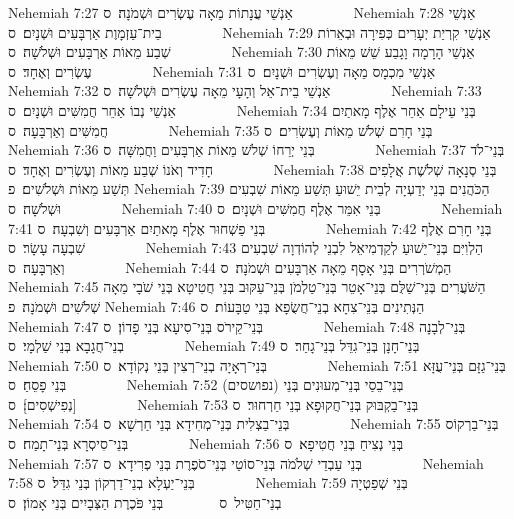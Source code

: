 Nehemiah 7:27	אַנְשֵׁי עֲנָתוֹת מֵאָה עֶשְׂרִים וּשְׁמֹנָה׃ {ס}        
Nehemiah 7:28	אַנְשֵׁי בֵית־עַזְמָוֶת אַרְבָּעִים וּשְׁנָיִם׃ {ס}        
Nehemiah 7:29	אַנְשֵׁי קִרְיַת יְעָרִים כְּפִירָה וּבְאֵרוֹת שְׁבַע מֵאוֹת אַרְבָּעִים וּשְׁלֹשָׁה׃ {ס}        
Nehemiah 7:30	אַנְשֵׁי הָרָמָה וָגָבַע שֵׁשׁ מֵאוֹת עֶשְׂרִים וְאֶחָד׃ {ס}        
Nehemiah 7:31	אַנְשֵׁי מִכְמָס מֵאָה וְעֶשְׂרִים וּשְׁנָיִם׃ {ס}        
Nehemiah 7:32	אַנְשֵׁי בֵית־אֵל וְהָעָי מֵאָה עֶשְׂרִים וּשְׁלֹשָׁה׃ {ס}        
Nehemiah 7:33	אַנְשֵׁי נְבוֹ אַחֵר חֲמִשִּׁים וּשְׁנָיִם׃ {ס}        
Nehemiah 7:34	בְּנֵי עֵילָם אַחֵר אֶלֶף מָאתַיִם חֲמִשִּׁים וְאַרְבָּעָה׃ {ס}        
Nehemiah 7:35	בְּנֵי חָרִם שְׁלֹשׁ מֵאוֹת וְעֶשְׂרִים׃ {ס}        
Nehemiah 7:36	בְּנֵי יְרֵחוֹ שְׁלֹשׁ מֵאוֹת אַרְבָּעִים וַחֲמִשָּׁה׃ {ס}        
Nehemiah 7:37	בְּנֵי־לֹד חָדִיד וְאֹנוֹ שְׁבַע מֵאוֹת וְעֶשְׂרִים וְאֶחָד׃ {ס}        
Nehemiah 7:38	בְּנֵי סְנָאָה שְׁלֹשֶׁת אֲלָפִים תְּשַׁע מֵאוֹת וּשְׁלֹשִׁים׃ {פ}
Nehemiah 7:39	הַכֹּהֲנִים בְּנֵי יְדַעְיָה לְבֵית יֵשׁוּעַ תְּשַׁע מֵאוֹת שִׁבְעִים וּשְׁלֹשָׁה׃ {ס}        
Nehemiah 7:40	בְּנֵי אִמֵּר אֶלֶף חֲמִשִּׁים וּשְׁנָיִם׃ {ס}        
Nehemiah 7:41	בְּנֵי פַשְׁחוּר אֶלֶף מָאתַיִם אַרְבָּעִים וְשִׁבְעָה׃ {ס}        
Nehemiah 7:42	בְּנֵי חָרִם אֶלֶף שִׁבְעָה עָשָׂר׃ {ס}        
Nehemiah 7:43	הַלְוִיִּם בְּנֵי־יֵשׁוּעַ לְקַדְמִיאֵל לִבְנֵי לְהוֹדְוָה שִׁבְעִים וְאַרְבָּעָה׃ {ס}        
Nehemiah 7:44	הַמְשֹׁרְרִים בְּנֵי אָסָף מֵאָה אַרְבָּעִים וּשְׁמֹנָה׃ {ס}        
Nehemiah 7:45	הַשֹּׁעֲרִים בְּנֵי־שַׁלֻּם בְּנֵי־אָטֵר בְּנֵי־טַלְמֹן בְּנֵי־עַקּוּב בְּנֵי חֲטִיטָא בְּנֵי שֹׁבָי מֵאָה שְׁלֹשִׁים וּשְׁמֹנָה׃ {פ}
Nehemiah 7:46	הַנְּתִינִים בְּנֵי־צִחָא בְנֵי־חֲשֻׂפָא בְּנֵי טַבָּעוֹת׃ {ס}        
Nehemiah 7:47	בְּנֵי־קֵירֹס בְּנֵי־סִיעָא בְּנֵי פָדוֹן׃ {ס}        
Nehemiah 7:48	בְּנֵי־לְבָנָה בְנֵי־חֲגָבָא בְּנֵי שַׁלְמָי׃ {ס}        
Nehemiah 7:49	בְּנֵי־חָנָן בְּנֵי־גִדֵּל בְּנֵי־גָחַר׃ {ס}        
Nehemiah 7:50	בְּנֵי־רְאָיָה בְנֵי־רְצִין בְּנֵי נְקוֹדָא׃ {ס}        
Nehemiah 7:51	בְּנֵי־גַזָּם בְּנֵי־עֻזָּא בְּנֵי פָסֵחַ׃ {ס}        
Nehemiah 7:52	בְּנֵי־בֵסַי בְּנֵי־מְעוּנִים בְּנֵי (נפושסים) [נְפִישְׁסִים]׃ {ס}        
Nehemiah 7:53	בְּנֵי־בַקְבּוּק בְּנֵי־חֲקוּפָא בְּנֵי חַרְחוּר׃ {ס}        
Nehemiah 7:54	בְּנֵי־בַצְלִית בְּנֵי־מְחִידָא בְּנֵי חַרְשָׁא׃ {ס}        
Nehemiah 7:55	בְּנֵי־בַרְקוֹס בְּנֵי־סִיסְרָא בְּנֵי־תָמַח׃ {ס}        
Nehemiah 7:56	בְּנֵי נְצִיחַ בְּנֵי חֲטִיפָא׃ {ס}        
Nehemiah 7:57	בְּנֵי עַבְדֵי שְׁלֹמֹה בְּנֵי־סוֹטַי בְּנֵי־סֹפֶרֶת בְּנֵי פְרִידָא׃ {ס}        
Nehemiah 7:58	בְּנֵי־יַעְלָא בְנֵי־דַרְקוֹן בְּנֵי גִדֵּל׃ {ס}        
Nehemiah 7:59	בְּנֵי שְׁפַטְיָה בְנֵי־חַטִּיל {ס}        בְּנֵי פֹּכֶרֶת הַצְּבָיִים בְּנֵי אָמוֹן׃ {ס}        
